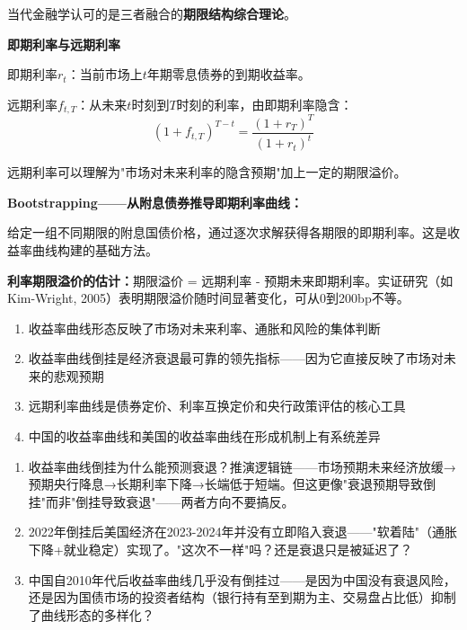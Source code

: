 \documentclass[a4paper,11pt]{ctexbook}
\begin{document}
{\begin{qualitative}
当代金融学认可的是三者融合的\textbf{期限结构综合理论}。
\end{qualitative}

\begin{quantitative}
\textbf{即期利率与远期利率}

即期利率$r_t$：当前市场上$t$年期零息债券的到期收益率。

远期利率$f_{t,T}$：从未来$t$时刻到$T$时刻的利率，由即期利率隐含：
\[
(1 + f_{t,T})^{T-t} = \frac{(1 + r_T)^T}{(1 + r_t)^t}
\]

远期利率可以理解为"市场对未来利率的隐含预期"加上一定的期限溢价。

\textbf{Bootstrapping——从附息债券推导即期利率曲线：}

给定一组不同期限的附息国债价格，通过逐次求解获得各期限的即期利率。这是收益率曲线构建的基础方法。

\textbf{利率期限溢价的估计：}期限溢价 = 远期利率 - 预期未来即期利率。实证研究（如Kim-Wright, 2005）表明期限溢价随时间显著变化，可从0到200bp不等。
\end{quantitative}

\begin{lessonsummary}
\begin{enumerate}
  \item 收益率曲线形态反映了市场对未来利率、通胀和风险的集体判断
  \item 收益率曲线倒挂是经济衰退最可靠的领先指标——因为它直接反映了市场对未来的悲观预期
  \item 远期利率曲线是债券定价、利率互换定价和央行政策评估的核心工具
  \item 中国的收益率曲线和美国的收益率曲线在形成机制上有系统差异
\end{enumerate}
\end{lessonsummary}

\begin{discuss}
\begin{enumerate}
  \item 收益率曲线倒挂为什么能预测衰退？推演逻辑链——市场预期未来经济放缓→预期央行降息→长期利率下降→长端低于短端。但这更像"衰退预期导致倒挂"而非"倒挂导致衰退"——两者方向不要搞反。
  \item 2022年倒挂后美国经济在2023-2024年并没有立即陷入衰退——"软着陆"（通胀下降+就业稳定）实现了。"这次不一样"吗？还是衰退只是被延迟了？
  \item 中国自2010年代后收益率曲线几乎没有倒挂过——是因为中国没有衰退风险，还是因为国债市场的投资者结构（银行持有至到期为主、交易盘占比低）抑制了曲线形态的多样化？
\end{enumerate}
\end{discuss}

}
\end{document}
